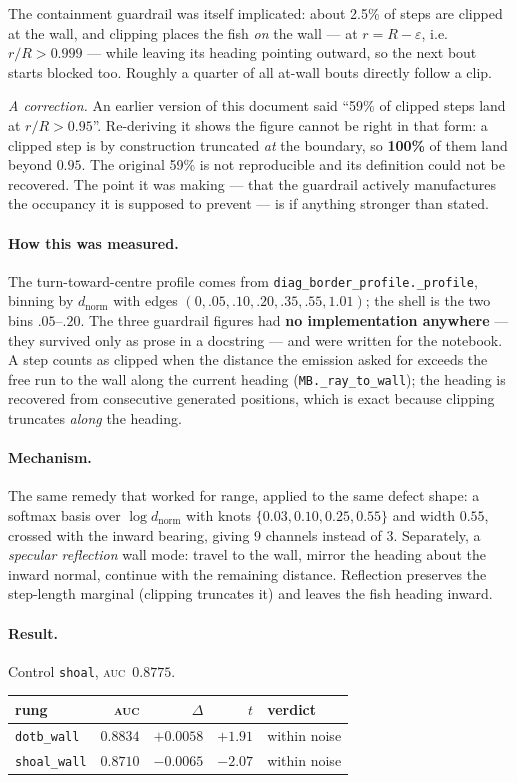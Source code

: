 \documentclass[11pt,a4paper]{article}
\newcommand{\nul}[1]{\textcolor{nullc}{#1}}
\newcommand{\auc}{\textsc{auc}}
\newcommand{\code}[1]{\texttt{\small #1}}
\begin{document}
The containment guardrail was itself implicated: about 2.5\% of steps are clipped at the
wall, and clipping places the fish \emph{on} the wall --- at $r = R-\varepsilon$, i.e.\
$r/R > 0.999$ --- while leaving its heading pointing outward, so the next bout starts
blocked too. Roughly a quarter of all at-wall bouts directly follow a clip.

\emph{A correction.} An earlier version of this document said ``59\% of clipped steps land
at $r/R>0.95$''. Re-deriving it shows the figure cannot be right in that form: a clipped
step is by construction truncated \emph{at} the boundary, so \textbf{100\%} of them land
beyond $0.95$. The original 59\% is not reproducible and its definition could not be
recovered. The point it was making --- that the guardrail actively manufactures the
occupancy it is supposed to prevent --- is if anything stronger than stated.

\paragraph{How this was measured.} The turn-toward-centre profile comes from
\code{diag\_border\_profile.\_profile}, binning by $d_{\mathrm{norm}}$ with edges
$(0,.05,.10,.20,.35,.55,1.01)$; the shell is the two bins $.05$--$.20$. The three guardrail
figures had \textbf{no implementation anywhere} --- they survived only as prose in a
docstring --- and were written for the notebook. A step counts as clipped when the distance
the emission asked for exceeds the free run to the wall along the current heading
(\code{MB.\_ray\_to\_wall}); the heading is recovered from consecutive generated positions,
which is exact because clipping truncates \emph{along} the heading.

\paragraph{Mechanism.}
The same remedy that worked for range, applied to the same defect shape: a softmax basis
over $\log d_{\mathrm{norm}}$ with knots $\{0.03, 0.10, 0.25, 0.55\}$ and width $0.55$,
crossed with the inward bearing, giving 9 channels instead of 3. Separately, a
\emph{specular reflection} wall mode: travel to the wall, mirror the heading about the
inward normal, continue with the remaining distance. Reflection preserves the step-length
marginal (clipping truncates it) and leaves the fish heading inward.

\paragraph{Result.} Control \code{shoal}, \auc\ $0.8775$.
\begin{center}\small
\begin{tabular}{lrrrl}
\toprule
rung & \auc{} & $\Delta$ & $t$ & verdict \\
\midrule
\code{dotb\_wall}  & $0.8834$ & $+0.0058$ & $+1.91$ & \nul{within noise} \\
\code{shoal\_wall} & $0.8710$ & $-0.0065$ & $-2.07$ & \nul{within noise} \\
\bottomrule
\end{tabular}
\end{center}
\end{document}
